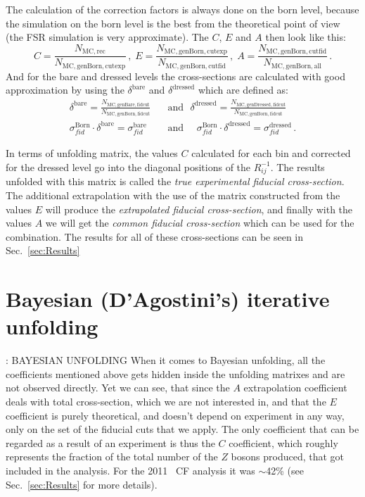 The calculation of the correction factors is always done on the born level, because the simulation on the born level is the best from the theoretical point of view (the FSR simulation is very approximate). The $C$, $E$ and $A$ then look like this:
\begin{equation}
C = \frac{N_\mathrm{MC, rec}}{N_\mathrm{MC, genBorn, cutexp}}\,, \;
E = \frac{N_\mathrm{MC, genBorn, cutexp}}{N_\mathrm{MC, genBorn, cutfid}}\,, \;
A = \frac{N_\mathrm{MC, genBorn, cutfid}}{N_\mathrm{MC, genBorn, all}}\,.
\end{equation}
And for the bare and dressed levels the cross-sections are calculated with good approximation by using the $\delta^\mathrm{bare}$ and $\delta^\mathrm{dressed}$ which are defined as:
\begin{equation}
\begin{split}
  \delta^\mathrm{bare} = \frac{N_\mathrm{MC, genBare, fidcut}}{N_\mathrm{MC, genBorn, fidcut}}\:\:\:&\mbox{and}\:\:\:
  \delta^\mathrm{dressed} = \frac{N_\mathrm{MC, genDressed, fidcut}}{N_\mathrm{MC, genBorn, fidcut}}\\
  \sigma_{fid}^\mathrm{Born} \cdot \delta^\mathrm{bare} =
  \sigma_{fid}^\mathrm{bare} \:\:\:\:\:\:&\mbox{and}\:\:\:\:\:\:
  \sigma_{fid}^\mathrm{Born} \cdot \delta^\mathrm{dressed} =
  \sigma_{fid}^\mathrm{dressed} \,.
\end{split}
\end{equation}

In terms of unfolding matrix, the values $C$ calculated for each bin and corrected for the dressed level go into the diagonal positions of the $R^{-1}_{ij}$. The results unfolded with this matrix is called the {\itshape true experimental fiducial cross-section}. The additional extrapolation with the use of the matrix constructed from the values $E$ will produce the {\itshape extrapolated fiducial cross-section}, and finally with the values $A$ we will get the {\itshape common fiducial cross-section} which can be used for the combination. The results for all of these cross-sections can be seen in Sec.~\ref{sec:Results}

\section{Bayesian (D'Agostini's) iterative unfolding}



\tbu: BAYESIAN UNFOLDING
\cite{lib:zcs_bayes}
When it comes to Bayesian unfolding, all the coefficients mentioned above gets hidden inside the unfolding matrixes and are not observed directly. Yet we can see, that since the $A$ extrapolation coefficient deals with total cross-section, which we are not interested in, and that the $E$ coefficient is purely theoretical, and doesn't depend on experiment in any way, only on the set of the fiducial cuts that we apply. The only coefficient that can be regarded as a result of an experiment is thus the $C$ coefficient, which roughly represents the fraction of the total number of the $Z$ bosons produced, that got included in the analysis. For the 2011 \Zee\ CF analysis it was $\sim$42\% (see Sec.~\ref{sec:Results} for more details).

